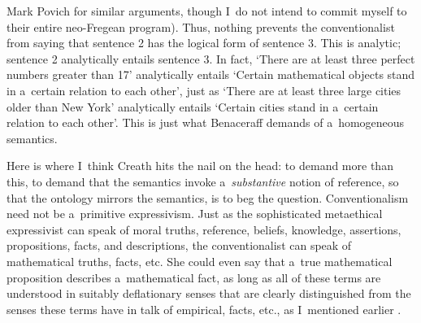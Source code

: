 \begin{artengenv}{Mark Povich}
\parencite*[][]{hale_reasons_2001} %
 for similar arguments, though I~do not intend to commit myself to their entire neo-Fregean program). Thus, nothing prevents the conventionalist from saying that sentence 2 has the logical form of sentence 3. This is analytic; sentence 2 analytically entails sentence 3. In fact, ‘There are at least three perfect numbers greater than 17' analytically entails ‘Certain mathematical objects stand in a~certain relation to each other', just as ‘There are at least three large cities older than New York' analytically entails ‘Certain cities stand in a~certain relation to each other'. This is just what Benaceraff demands of a~homogeneous semantics.

Here is where I~think Creath
\parencite*[][]{creath_benacerraf_1980} %
 hits the nail on the head: to demand more than this, to demand that the semantics invoke a~\textit{substantive} notion of reference, so that the ontology mirrors the semantics, is to beg the question. Conventionalism need not be a~primitive expressivism. Just as the sophisticated metaethical expressivist 
\parencites[e.g.,][]{blackburn_essays_1993}{kalderon_quasi-realism_2005}
 can speak of moral truths, reference, beliefs, knowledge, assertions, propositions, facts, and descriptions, the conventionalist can speak of mathematical truths, facts, etc. She could even say that a~true mathematical proposition describes a~mathematical fact, as long as all of these terms are understood in suitably deflationary senses that are clearly distinguished from the senses these terms have in talk of empirical, facts, etc., as I~mentioned earlier 
\parencites[][]{thomasson_norms_2020}[see also][]{baker_wittgenstein_2009}.%



\end{artengenv}
